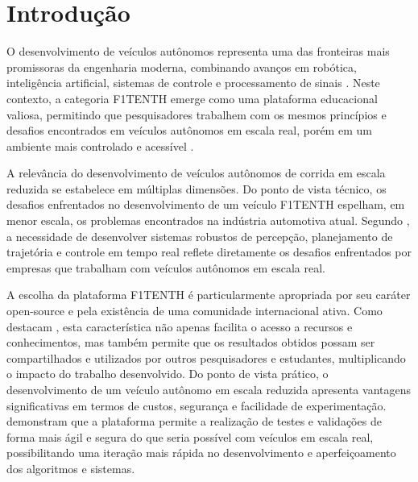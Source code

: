 
\chapter*[Introdução]{Introdução}

O desenvolvimento de veículos autônomos representa uma das fronteiras mais
promissoras da engenharia moderna, combinando avanços em robótica, inteligência
artificial, sistemas de controle e processamento de sinais
\cite{Karaman2011Optimal}. Neste contexto, a categoria F1TENTH emerge como uma
plataforma educacional valiosa, permitindo que pesquisadores trabalhem com os
mesmos princípios e desafios encontrados em veículos autônomos em escala real,
porém em um ambiente mais controlado e acessível \cite{OKelly2020F1TENTH}.

A relevância do desenvolvimento de veículos autônomos de corrida em escala
reduzida se estabelece em múltiplas dimensões. Do ponto de vista técnico, os
desafios enfrentados no desenvolvimento de um veículo F1TENTH espelham, em
menor escala, os problemas encontrados na indústria automotiva atual. Segundo
\cite{Babu2020Simulator}, a necessidade de desenvolver sistemas robustos de
percepção, planejamento de trajetória e controle em tempo real reflete
diretamente os desafios enfrentados por empresas que trabalham com veículos
autônomos em escala real.

A escolha da plataforma F1TENTH é particularmente apropriada por seu caráter
open-source e pela existência de uma comunidade internacional ativa. Como
destacam \cite{Agnihotri2020Teaching}, esta característica não apenas facilita
o acesso a recursos e conhecimentos, mas também permite que os resultados
obtidos possam ser compartilhados e utilizados por outros pesquisadores e
estudantes, multiplicando o impacto do trabalho desenvolvido. Do ponto de vista
prático, o desenvolvimento de um veículo autônomo em escala reduzida apresenta
vantagens significativas em termos de custos, segurança e facilidade de
experimentação. \cite{Wang2020LMPC} demonstram que a plataforma permite a
realização de testes e validações de forma mais ágil e segura do que seria
possível com veículos em escala real, possibilitando uma iteração mais rápida
no desenvolvimento e aperfeiçoamento dos algoritmos e sistemas.

